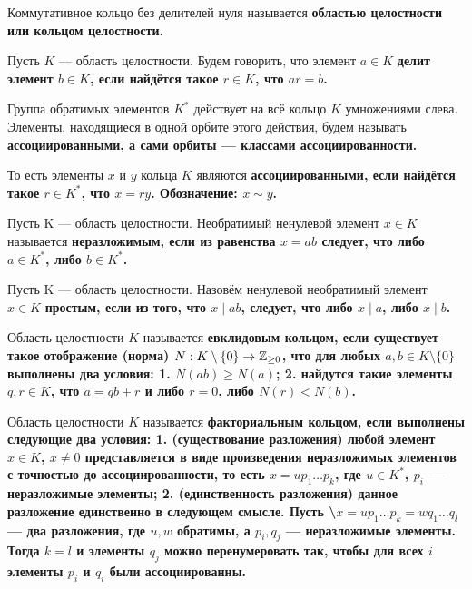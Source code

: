 \begin{defn}
Коммутативное кольцо без делителей нуля называется \bf{областью целостности} или \bf{кольцом целостности}.
\end{defn}

\begin{defn}
Пусть \(K\) --- область целостности. Будем говорить, что элемент \(a\in K\) \bf{делит} элемент \(b\in K\), если найдётся такое \(r \in K\), что \(ar=b\).

Группа обратимых элементов \(K^*\) действует на всё кольцо \(K\) умножениями слева. Элементы, находящиеся в одной орбите этого действия, будем называть \bf{ассоциированными}, а сами орбиты --- \bf{классами ассоциированности}.

То есть элементы \(x\) и \(y\) кольца \(K\) являются \bf{ассоциированными}, если найдётся такое \(r \in K^*\), что \(x=ry\). Обозначение: \(x \sim y\).
\end{defn}

\begin{defn}
Пусть K --- область целостности. Необратимый ненулевой элемент \(x \in K\) называется \bf{неразложимым}, если из равенства \(x=ab\) следует, что либо \(a \in K^*\), либо \(b \in K^*\).
\end{defn}

\begin{defn}
Пусть K --- область целостности. Назовём ненулевой необратимый элемент \(x \in K\) \bf{простым}, если из того, что \(x \mid ab\), следует, что либо \(x \mid a\), либо \(x \mid b\).
\end{defn}

\begin{defn}
Область целостности \(K\) называется \bf{евклидовым кольцом}, если существует такое отображение (\bf{норма}) \(N : K \setminus \{0\} \rightarrow \mathbb{Z}_{\ge 0}\), что для любых \(a,b \in K \setminus \{0\}\) выполнены два условия:
1. \(N(ab) \ge N(a)\);
2. найдутся такие элементы \(q , r\in K\), что \(a=qb+r\) и либо \(r=0\), либо \(N(r) < N(b)\).

\end{defn}

\begin{defn}
Область целостности \(K\) называется \bf{факториальным кольцом}, если выполнены следующие два условия:
1. (\bf{существование разложения}) любой элемент \(x \in K\), \(x \neq 0\) представляется в виде произведения неразложимых элементов с точностью до ассоциированности, то есть \(x = u p_1 \ldots p_k\), где \(u \in K^*\), \(p_i\) --- неразложимые элементы;
2. (\bf{единственность разложения}) данное разложение единственно в следующем смысле. Пусть \textbackslash{}\(x = u p_1 \ldots p_k = w q_1 \ldots q_l\) --- два разложения, где \(u,w\) обратимы, а \(p_i,q_j\) --- неразложимые элементы. Тогда \(k=l\) и элементы \(q_j\) можно перенумеровать так, чтобы для всех \(i\) элементы \(p_i\) и \(q_i\) были ассоциированны.

\end{defn}

